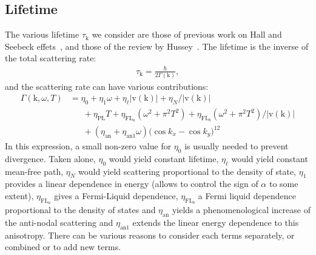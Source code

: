 \documentclass[notitlepage,11pt,nofootinbib]{revtex4-1}
\renewcommand{\vec}[1]{\bm{\mathrm{#1}}}
\begin{document}
\subsection{Lifetime}\label{section_lifetime}

The various lifetime $\tau_{\vec k}$ we consider are those of previous work on Hall and Seebeck effets~\cite{verret_phenomenological_2017}, and those of the review by Hussey~\cite{hussey_phenomenology_2008}. The lifetime is the inverse of the total scattering rate:
\begin{align}
\tau_{\vec k}=\frac{\hbar}{2\Gamma(\vec k)},
\end{align}
and the scattering rate can have various contributions:
\begin{align}
\Gamma(\vec k,\omega,T) 
&=\eta_0
+ \eta_{1}\omega
+ \eta_{\ell}|\vec v(\vec k)|
+ \eta_{N}/|\vec v(\vec k)|
\nonumber\\&
\phantom{=\ }
+ \eta_{\text{PL}}T
+ \eta_{\text{FL}_a}(\omega^2 + \pi^2T^2)
+ \eta_{\text{FL}_b}(\omega^2 + \pi^2T^2)/|\vec v(\vec k)|
\nonumber\\&
\phantom{=\ }
+ (\eta_{\text{an}} + \eta_{\text{an}1}\omega)\big(\cos k_x - \cos k_y\big)^{12}
\end{align}
In this expression, a small non-zero value for $\eta_0$ is usually needed to prevent divergence. Taken alone, $\eta_0$ would yield constant lifetime, $\eta_\ell$ would yield constant mean-free path, $\eta_N$ would yield scattering proportional to the density of state, $\eta_1$ provides a linear dependence in energy (allows to control the sign of $\alpha$ to some extent), $\eta_{\text{FL}_a}$ gives a Fermi-Liquid dependence, $\eta_{\text{FL}_b}$ a Fermi liquid dependence proportional to the density of states and $\eta_{\text{an}}$ yields a phenomenological increase of the anti-nodal scattering and $\eta_{\text{an}1}$ extends the linear energy dependence to this anisotropy. There can be various reasons to consider each terms separately, or combined or to add new terms.






\end{document}
